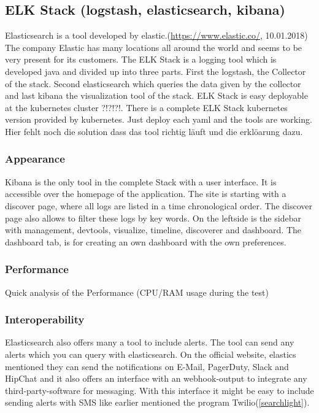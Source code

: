 \subsection{ELK Stack (logstash, elasticsearch, kibana)}
\label{elk} %
Elasticsearch is a tool developed by elastic.(\url{https://www.elastic.co/}, 10.01.2018) The company Elastic has many locations all around the world and seems to be very present for its customers.
The ELK Stack is a logging tool which is developed java and divided up into three parts. First the logstash, the Collector of the stack. Second elasticsearch which queries the data given by the collector and last kibana the visualization tool of the stack.
ELK Stack is easy deployable at the kubernetes cluster ?!?!?!. There is a complete ELK Stack kubernetes version provided by kubernetes. Just deploy each yaml and the tools are working. Hier fehlt noch die solution dass das tool richtig läuft und die erklöarung dazu.

\subsubsection{Appearance}%
Kibana is the only tool in the complete Stack with a user interface. It is accessible over the homepage of the application. The site is starting with a discover page, where all logs are listed in a time chronological order. The discover page also allows to filter these logs by key words. On the leftside is the sidebar with management, devtools, visualize, timeline, discoverer and dashboard. The dashboard tab, is for creating an own dashboard with the own preferences.
\subsubsection{Performance}
Quick analysis of the Performance (CPU/RAM usage during the test)
\subsubsection{Interoperability}
Elasticsearch also offers many a tool to include alerts. The tool can send any alerts which you can query with elasticsearch. On the official website, elastics mentioned they can send the notifications on E-Mail, PagerDuty, Slack and HipChat and it also offers an interface with an webhook-output to integrate any third-party-software for messaging. With this interface it might be easy to include sending alerts with SMS like earlier mentioned the program Twilio(\ref{searchlight}).
